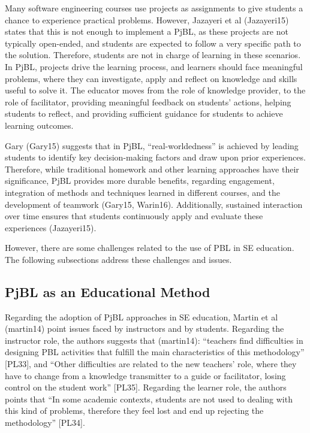 Many software engineering courses use projects as assignments to give students a chance to experience practical problems. However, Jazayeri et al (Jazayeri15) states that this is not enough to implement a PjBL, as these projects are not typically open-ended, and students are expected to follow a very specific path to the solution. Therefore, students are not in charge of learning in these scenarios. In PjBL, projects drive the learning process, and learners should face meaningful problems, where they can investigate, apply and reflect on knowledge and skills useful to solve it. The educator moves from the role of knowledge provider, to the role of facilitator, providing meaningful feedback on students’ actions, helping students to reflect, and providing sufficient guidance for students to achieve learning outcomes.

Gary (Gary15) suggests that in PjBL, “real-worldedness” is achieved by leading students to identify key decision-making factors and draw upon prior experiences. Therefore, while traditional homework and other learning approaches have their significance, PjBL provides more durable benefits, regarding engagement, integration of methods and techniques learned in different courses, and the development of teamwork (Gary15, Warin16). Additionally, sustained interaction over time ensures that students continuously apply and evaluate these experiences (Jazayeri15).

However, there are some challenges related to the use of PBL in SE education. The following subsections address these challenges and issues.

\subsection{PjBL as an Educational Method}

Regarding the adoption of PjBL approaches in SE education, Martin et al (martin14) point issues faced by instructors and by students. Regarding the instructor role, the authors suggests that (martin14): “teachers find difficulties in designing PBL activities that fulfill the main characteristics of this methodology” [PL33], and “Other difficulties are related to the new teachers’ role, where they have to change from a knowledge transmitter to a guide or facilitator, losing control on the student work” [PL35]. Regarding the learner role, the authors points that “In some academic contexts, students are not used to dealing with this kind of problems, therefore they feel lost and end up rejecting the methodology” [PL34].

